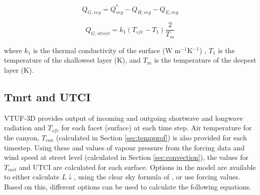 \documentclass[final,3p,times,authoryear]{elsarticle}
\begin{document}
\begin{equation}\label{eq:qgvtuf}
 Q_{G,veg} =  Q^{*}_{veg} - Q_{H,veg} - Q_{E,veg}
\end{equation}

\begin{equation}\label{eq:qgtuf}
 Q_{G,street} = k_{1}  ( T_{sfc} - T_{1} ) \frac {2}{T_{m}}
\end{equation}

where $k_{1}$ is the thermal conductivity of the surface (W m$^{-1}$K$^{-1}$) , $T_{1}$ is the temperature of the shallowest layer (K), and $T_{m}$ is the temperature of the deepest layer (K).



\subsection{Tmrt and UTCI}\label{sec:tmrtutci}

VTUF-3D provides output of incoming and outgoing shortwave and longwave radiation and $T_{sfc}$ for each facet (surface) at each time step. Air temperature for the canyon, $T_{can}$ (calculated in Section \ref{sec:tempprof}) is also provided for each timestep. Using these and values of vapour pressure from the forcing data and wind speed at street level (calculated in Section \ref{sec:convection}), the values for $T_{mrt}$ and UTCI are calculated for each surface. Options in the model are available to either calculate $L\downarrow$, using the clear sky formula of \cite{Prata1996}, or use forcing values. Based on this, different options can be used to calculate the following equations.
\end{document}
